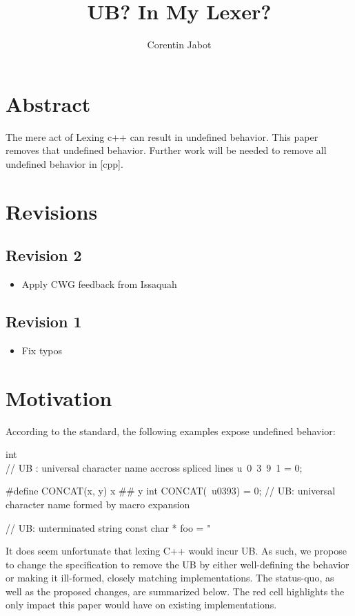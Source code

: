 \documentclass{wg21}
\title{UB? In My Lexer?}
\author{Corentin Jabot}{corentin.jabot@gmail.com}
\begin{document}
\maketitle

\section{Abstract}

The mere act of Lexing c++ can result in undefined behavior.
This paper removes that undefined behavior.
Further work will be needed to remove all undefined behavior in [cpp].


\section{Revisions}

\subsection*{Revision 2}
\begin{itemize}
\item Apply CWG feedback from Issaquah
\end{itemize}

\subsection*{Revision 1}
\begin{itemize}
\item Fix typos
\end{itemize}


\section {Motivation}

According to the standard, the following examples expose undefined behavior:

\begin{colorblock}
int \\ // UB : universal character name accross spliced lines
u\
0\
3\
9\
1 = 0;


#define CONCAT(x, y) x ## y
int CONCAT(\, u0393) = 0; // UB: universal character name formed by macro expansion

// UB: unterminated string
const char * foo = "
\end{colorblock}

It does seem unfortunate that lexing C++ would incur UB.
As such, we propose to change the specification to remove the UB by either well-defining the behavior or making it ill-formed,
closely matching implementations.
The status-quo, as well as the proposed changes, are summarized below.
The red cell highlights the only impact this paper would have on existing implementations.
\end{document}
